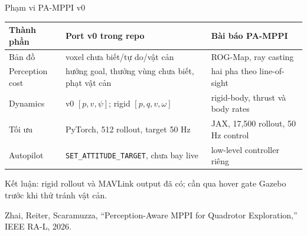 \documentclass[aspectratio=169,11pt]{beamer}
\begin{document}
\begin{frame}{Phạm vi PA-MPPI v0}
  \small
  \renewcommand{\arraystretch}{1.15}
  \begin{tabular}{>{\RaggedRight\arraybackslash}p{}
                  >{\RaggedRight\arraybackslash}p{}
                  >{\RaggedRight\arraybackslash}p{}}
    \toprule
    Thành phần & Port v0 trong repo & Bài báo PA-MPPI \\
    \midrule
    Bản đồ & voxel chưa biết/tự do/vật cản & ROG-Map, ray casting \\
    Perception cost & hướng goal, thưởng vùng chưa biết, phạt vật cản
      & hai pha theo line-of-sight \\
    Dynamics & v0 $[p,v,\psi]$; rigid $[p,q,v,\omega]$
      & rigid-body, thrust và body rates \\
    Tối ưu & PyTorch, 512 rollout, target 50 Hz
      & JAX, 17,500 rollout, 50 Hz control \\
    Autopilot & \texttt{SET\_ATTITUDE\_TARGET}, chưa bay live
      & low-level controller riêng \\
    \bottomrule
  \end{tabular}

  \vspace{0.35em}
  \alert{Kết luận:} rigid rollout và MAVLink output đã có; cần qua hover gate
  Gazebo trước khi thử tránh vật cản.

  \vfill
  \scriptsize Zhai, Reiter, Scaramuzza, ``Perception-Aware MPPI for Quadrotor
  Exploration,'' IEEE RA-L, 2026.
\end{frame}
\end{document}
